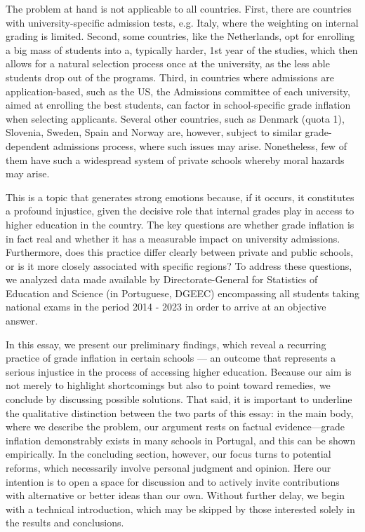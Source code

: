 \documentclass{article}
\begin{document}
The problem at hand is not applicable to all countries. First, there are countries with university-specific admission tests, e.g. Italy, where the weighting on internal grading is limited. Second, some countries, like the Netherlands, opt for enrolling a big mass of students into a, typically harder, 1st year of the studies, which then allows for a natural selection process once at the university, as the less able students drop out of the programs. Third, in countries where admissions are application-based, such as the US, the Admissions committee of each university, aimed at enrolling the best students, can factor in school-specific grade inflation when selecting applicants. Several other countries, such as Denmark (quota 1), Slovenia, Sweden, Spain and Norway are, however, subject to similar grade-dependent admissions process, where such issues may arise. Nonetheless, few of them have such a widespread system of private schools whereby moral hazards may arise.

This is a topic that generates strong emotions because, if it occurs, it constitutes a profound injustice, given the decisive role that internal grades play in access to higher education in the country. The key questions are whether grade inflation is in fact real and whether it has a measurable impact on university admissions. Furthermore, does this practice differ clearly between private and public schools, or is it more closely associated with specific regions? To address these questions, we analyzed data made available by Directorate-General for Statistics of Education and Science (in Portuguese, DGEEC) encompassing all students taking national exams in the period 2014 - 2023 in order to arrive at an objective answer.

In this essay, we present our preliminary findings, which reveal a recurring practice of grade inflation in certain schools — an outcome that represents a serious injustice in the process of accessing higher education. Because our aim is not merely to highlight shortcomings but also to point toward remedies, we conclude by discussing possible solutions. That said, it is important to underline the qualitative distinction between the two parts of this essay: in the main body, where we describe the problem, our argument rests on factual evidence—grade inflation demonstrably exists in many schools in Portugal, and this can be shown empirically. In the concluding section, however, our focus turns to potential reforms, which necessarily involve personal judgment and opinion. Here our intention is to open a space for discussion and to actively invite contributions with alternative or better ideas than our own. Without further delay, we begin with a technical introduction, which may be skipped by those interested solely in the results and conclusions.
\end{document}
